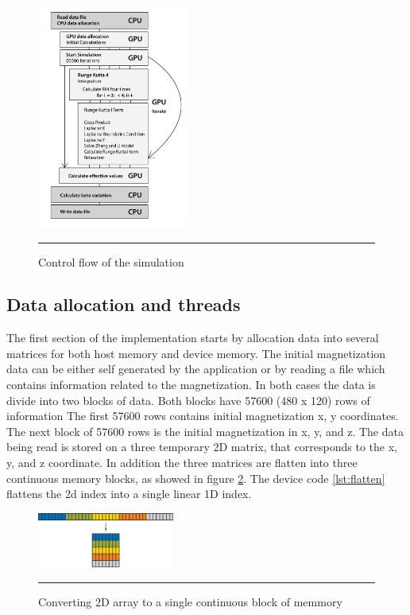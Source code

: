 \begin{figure}[htbp]
	\centering
		\includegraphics[width=0.45\textwidth]{Figures/flow.png}
		\rule{35em}{0.2pt}
	\caption[Control flow]{Control flow of the simulation}
	\label{fig:flow}
\end{figure}

\subsection{Data allocation and threads}

The first section of the implementation starts by allocation data into several matrices for both host memory and device memory. The initial magnetization data can be either self generated by the application or by reading a file which contains information related to the magnetization. In both cases the data is divide into two blocks of data. Both blocks have 57600 (480 x 120) rows of information The first 57600 rows contains initial magnetization x, y coordinates. The next block of 57600 rows is the initial magnetization in x, y, and z. The data being read is stored on a three temporary 2D matrix, that corresponds to the x, y, and z coordinate. In addition the three matrices are flatten into three continuous memory blocks, as showed in figure \ref{fig:flaten}. The device code \ref{lst:flatten} flattens the 2d index into a single linear 1D index.


\begin{figure}[htbp]
	\centering
		\includegraphics[width=0.4\textwidth]{Figures/flaten.png}
		\rule{35em}{0.2pt}
	\caption[2D Flatten array]{Converting 2D array to a single continuous block of memmory}
	\label{fig:flaten}
\end{figure}

